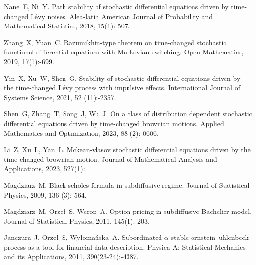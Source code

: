 \begin{thebibliography}{99}
    Nane~E, Ni~Y.
    \newblock Path stability of stochastic differential equations driven by
    time-changed {Lévy} noises\allowbreak[J].
    \newblock Alea-latin American Journal of Probability and Mathematical
    Statistics, 2018, 15\allowbreak (1):-507.
    
    Zhang~X, Yuan~C.
    \newblock Razumikhin-type theorem on time-changed stochastic functional
    differential equations with {Markovian} switching\allowbreak[J].
    \newblock Open Mathematics, 2019, 17\allowbreak (1):-699.
    
    Yin~X, Xu~W, Shen~G.
    \newblock Stability of stochastic differential equations driven by the
    time-changed {Lévy} process with impulsive effects\allowbreak[J].
    \newblock International Journal of Systems Science, 2021, 52\allowbreak
    (11):-2357.
    
    Shen~G, Zhang~T, Song~J, Wu~J.
    \newblock On a class of distribution dependent stochastic differential
    equations driven by time-changed brownian motions\allowbreak[J].
    \newblock Applied Mathematics and Optimization, 2023, 88\allowbreak
    (2):-0606.
    
    Li~Z, Xu~L, Yan~L.
    \newblock Mckean-vlasov stochastic differential equations driven by the
    time-changed brownian motion\allowbreak[J].
    \newblock Journal of Mathematical Analysis and Applications,
    2023{}, 527\allowbreak (1):.
    
    Magdziarz~M.
    \newblock Black-scholes formula in subdiffusive regime\allowbreak[J].
    \newblock Journal of Statistical Physics, 2009{}, 136\allowbreak
    (3):-564.
    
    Magdziarz~M, Orzeł~S, Weron~A.
    \newblock Option pricing in subdiffusive {Bachelier} model\allowbreak[J].
    \newblock Journal of Statistical Physics, 2011, 145\allowbreak (1):-203.
    
    Janczura~J, Orzeł~S, Wyłomańska~A.
    \newblock Subordinated $\alpha$-stable ornstein--uhlenbeck process as a tool
    for financial data description\allowbreak[J].
    \newblock Physica A: Statistical Mechanics and its Applications, 2011,
    390\allowbreak (23-24):-4387.
    

\end{thebibliography}
